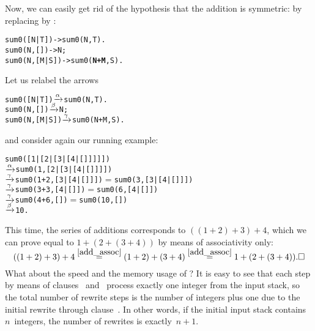 Now, we can easily get rid of the hypothesis that the addition is
symmetric: by replacing  by :
\begin{alltt}
sum0([N|T])   -> sum0(N,T).
sum0(N,   []) -> N;
sum0(N,[M|S]) -> sum0(\textbf{N+M},S).
\end{alltt}
Let us relabel the arrows
\begin{alltt}
sum0([N|T])   \(\xrightarrow{\smash[t]{\alpha}}\) sum0(N,T).
sum0(N,   []) \(\xrightarrow{\smash[t]{\beta}}\) N;
sum0(N,[M|S]) \(\xrightarrow{\smash[t]{\gamma}}\) sum0(N+M,S).
\end{alltt}
and consider again our running example:
\begin{alltt}
sum0([1|[2|[3|[4|[]]]]])
          \(\xrightarrow{\smash[t]{\alpha}}\) sum0(1,[2|[3|[4|[]]]])
          \(\xrightarrow{\smash[t]{\gamma}}\) sum0(1+2,[3|[4|[]]])   \(=\) sum0(3,[3|[4|[]]])
          \(\xrightarrow{\smash[t]{\gamma}}\) sum0(3+3,[4|[]])       \(=\) sum0(6,[4|[]])
          \(\xrightarrow{\smash[t]{\gamma}}\) sum0(4+6,[])           \(=\) sum0(10,[])
          \(\xrightarrow{\smash[t]{\beta}}\) 10\textrm{.}
\end{alltt}
This time, the series of additions corresponds to \(((1+2)+3)+4\),
which we can prove equal to \(1+(2+(3+4))\) by means of associativity
only:
\begin{equation*}
((1 + 2) + 3) + 4
  \eqn{\ref{add_assoc}} (1 + 2) + (3 + 4)
  \eqn{\ref{add_assoc}} 1 + (2 + (3 + 4)).\hfill\Box
\end{equation*}
What about the speed and the memory usage of ? It is
easy to see that each step by means of clauses~\clause{\beta}
and~\clause{\gamma} process exactly one integer from the input stack,
so the total number of rewrite steps is the number of integers plus
one due to the initial rewrite through clause~\clause{\alpha}. In
other words, if the initial input stack contains \(n\)~integers, the
number of rewrites is exactly~\(n+1\).

